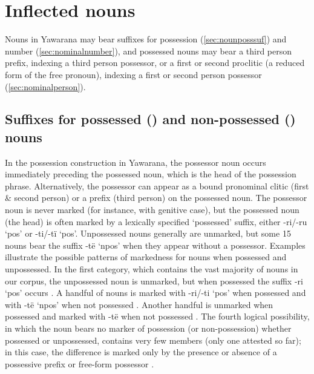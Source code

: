 \documentclass{memoir}
\begin{document}
\section{\texorpdfstring{Inflected nouns
\label{sec:nouninfl}}{Inflected nouns }}

Nouns in Yawarana may bear suffixes for possession
(\cref{sec:nounposssuf}) and number (\cref{sec:nominalnumber}), and
possessed nouns may bear a third person prefix, indexing a third person
possessor, or a first or second proclitic (a reduced form of the free
pronoun), indexing a first or second person possessor
(\cref{sec:nominalperson}).

\subsection{\texorpdfstring{Suffixes for possessed () and
non-possessed () nouns
\label{sec:nounposssuf}}{Suffixes for possessed () and non-possessed () nouns }}

In the possession construction in Yawarana, the possessor noun occurs
immediately preceding the possessed noun, which is the head of the
possession phrase. Alternatively, the possessor can appear as a bound
pronominal clitic (first \& second person) or a prefix (third person) on
the possessed noun. The possessor noun is never marked (for instance,
with genitive case), but the possessed noun (the head) is often marked
by a lexically specified `possessed' suffix, either -ri/-ru `pos' or
-ti/-tï `pos'. Unpossessed nouns generally are unmarked, but some 15
nouns bear the suffix -të `npos' when they appear without a possessor.
Examples  illustrate the
possible patterns of markedness for nouns when possessed and
unpossessed. In the first category, which contains the vast majority of
nouns in our corpus, the unpossessed noun is unmarked, but when
possessed the suffix -ri `pos' occurs . A handful
of nouns is marked with -ri/-ti `pos' when possessed and with -të `npos'
when not possessed . Another handful is unmarked
when possessed and marked with -të when not possessed
. The fourth logical possibility, in which the
noun bears no marker of possession (or non-possession) whether possessed
or unpossessed, contains very few members (only one attested so far); in
this case, the difference is marked only by the presence or absence of a
possessive prefix or free-form possessor .
\end{document}
